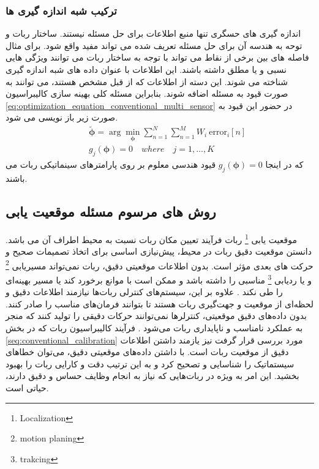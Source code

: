 \subsubsection{ترکیب شبه اندازه گیری ها}
اندازه گیری های حسگری تنها منبع اطلاعات برای حل مسئله نیستند. ساختار ربات و توحه به هندسه آن برای حل مسئله تعریف شده می تواند مفید واقع شود. برای مثال فاصله های بین برخی از نقاط می تواند با توجه به ساختار ربات می توانند ویژگی هایی نسبی و یا مطلق داشته باشند. این اطلاعات با عنوان داده های شبه اندازه گیری شناخته می شوند. این دسته از اطلاعات که از قبل مشخص هستند، می توانند به صورت قیود به مسئله اضافه شوند. بنابراین مسئله کلی بهینه سازی کالیبراسیون
\ref{eq:optimization_equation_conventional_multi_sensor}
در حضور این قیود به صورت زیر باز نویسی می شود. 
\begin{equation}
	\begin{aligned} \label{eq:optimization_equation_conventional_multi_sensor_measurement}
		&\tilde{\boldsymbol{\phi}} =  \arg\min_{\boldsymbol{\phi}} \sum_{n = 1 }^{N} \sum_{n = 1 }^{M} W_i~\text{error}_i[n] \\
		\quad &g_j(\boldsymbol{\phi}) = 0 \quad where \quad j = 1, \ldots, K
	\end{aligned}
\end{equation}
که در اینجا
$g_j(\boldsymbol{\phi}) = 0$ 
قیود هندسی معلوم بر روی پارامترهای سینماتیکی ربات می باشند.

\subsection{روش های مرسوم مسئله موقعیت یابی}
موقعیت یابی
\footnote{Localization}
 ربات فرآیند تعیین مکان ربات نسبت به محیط اطراف آن می باشد. دانستن موقعیت دقیق ربات در محیط، پیش‌نیازی اساسی برای اتخاذ تصمیمات صحیح و حرکت های بعدی مؤثر است. بدون اطلاعات موقعیتی دقیق، ربات نمی‌تواند مسیریابی
\footnote{motion planing}
  و یا ردیابی
\footnote{trakcing}
مناسبی را داشته باشد و ممکن است با موانع برخورد کند یا مسیر بهینه‌ای را طی نکند
\cite{ahmad2013cooperative}.
 علاوه بر این، سیستم‌های کنترلی ربات‌ها نیازمند اطلاعات دقیق و لحظه‌ای از موقعیت و جهت‌گیری ربات هستند تا بتوانند فرمان‌های مناسب را صادر کنند. بدون داده‌های دقیق موقعیتی، کنترلرها نمی‌توانند حرکات دقیقی را تولید کنند که منجر به عملکرد نامناسب و ناپایداری ربات می‌شود
\cite{guibas1997robot}.
فرآیند کالیبراسیون ربات که در بخش 
\ref{seq:conventional_calibration}
مورد بررسی قرار گرفت نیز یازمند داشتن اطلاعات دقیق از موقعیت ربات است. با داشتن داده‌های موقعیتی دقیق، می‌توان خطاهای سیستماتیک را شناسایی و تصحیح کرد و به این ترتیب دقت و کارایی ربات را بهبود بخشید. این امر به ویژه در ربات‌هایی که نیاز به انجام وظایف حساس و دقیق دارند، حیاتی است. 

